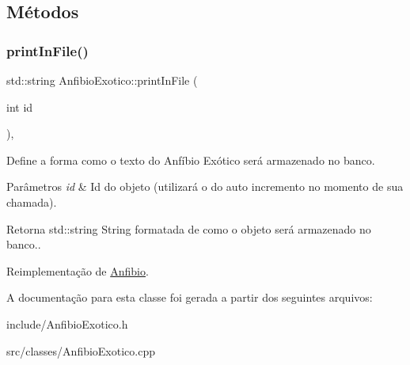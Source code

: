 \subsection{Métodos}
\mbox{\label{classAnfibioExotico_a08d9debec54258a0f43c8c503dfb23d0}} 
\subsubsection{\texorpdfstring{print\+In\+File()}{printInFile()}}
{\footnotesize\ttfamily std\+::string Anfibio\+Exotico\+::print\+In\+File (\begin{DoxyParamCaption}\item[{int}]{id }\end{DoxyParamCaption})\hspace{0.3cm}{\ttfamily [protected]}, {\ttfamily [virtual]}}



Define a forma como o texto do Anfíbio Exótico será armazenado no banco. 


\begin{DoxyParams}{Parâmetros}
{\em id} & Id do objeto (utilizará o do auto incremento no momento de sua chamada). \\
\hline
\end{DoxyParams}
\begin{DoxyReturn}{Retorna}
std\+::string String formatada de como o objeto será armazenado no banco.. 
\end{DoxyReturn}


Reimplementação de \hyperlink{classAnfibio_a46f3f30c89af05bcdd39abbe692d854f}{Anfibio}.



A documentação para esta classe foi gerada a partir dos seguintes arquivos\+:\begin{DoxyCompactItemize}
\item 
include/Anfibio\+Exotico.\+h\item 
src/classes/Anfibio\+Exotico.\+cpp\end{DoxyCompactItemize}
